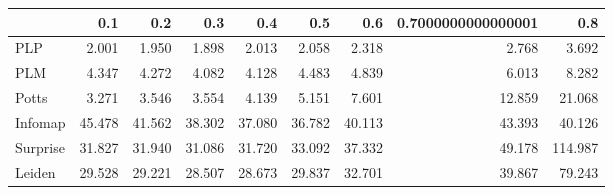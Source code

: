 \begin{tabular}{lrrrrrrrr}
\toprule
{} &    0.1 &    0.2 &    0.3 &    0.4 &    0.5 &    0.6 & 0.7000000000000001 &     0.8 \\
\midrule
PLP      &  2.001 &  1.950 &  1.898 &  2.013 &  2.058 &  2.318 &              2.768 &   3.692 \\
PLM      &  4.347 &  4.272 &  4.082 &  4.128 &  4.483 &  4.839 &              6.013 &   8.282 \\
Potts    &  3.271 &  3.546 &  3.554 &  4.139 &  5.151 &  7.601 &             12.859 &  21.068 \\
Infomap  & 45.478 & 41.562 & 38.302 & 37.080 & 36.782 & 40.113 &             43.393 &  40.126 \\
Surprise & 31.827 & 31.940 & 31.086 & 31.720 & 33.092 & 37.332 &             49.178 & 114.987 \\
Leiden   & 29.528 & 29.221 & 28.507 & 28.673 & 29.837 & 32.701 &             39.867 &  79.243 \\
\bottomrule
\end{tabular}
